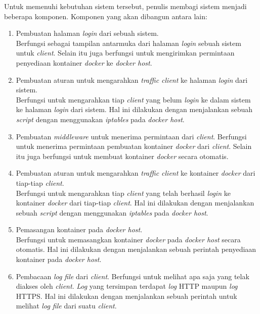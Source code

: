       \indent Untuk memenuhi kebutuhan sistem tersebut, penulis membagi sistem menjadi beberapa komponen. Komponen yang akan dibangun antara lain: 
      \begin{enumerate} 
      \item Pembuatan halaman \textit{login} dari sebuah sistem.\\
	      Berfungsi sebagai tampilan antarmuka dari halaman \textit{login} sebuah sistem untuk \textit{client}. Selain itu juga berfungsi untuk mengirimkan permintaan penyediaan kontainer \textit{docker} ke \textit{docker host}.
	  \item Pembuatan aturan untuk mengarahkan \textit{traffic client} ke halaman \textit{login} dari sistem.\\
		  Berfungsi untuk mengarahkan tiap \textit{client} yang belum \textit{login} ke dalam sistem ke halaman \textit{login} dari sistem. Hal ini dilakukan dengan menjalankan sebuah \textit{script} dengan menggunakan \textit{iptables} pada \textit{docker host}.
	  \item Pembuatan \textit{middleware} untuk menerima permintaan dari \textit{client}.
		  Berfungsi untuk menerima permintaan pembuatan kontainer \textit{docker} dari \textit{client}. Selain itu juga berfungsi untuk membuat kontainer \textit{docker} secara otomatis.
	  \item Pembuatan aturan untuk mengarahkan \textit{traffic client} ke kontainer \textit{docker} dari tiap-tiap \textit{client}.\\
		  Berfungsi untuk mengarahkan tiap \textit{client} yang telah berhasil \textit{login} ke kontainer \textit{docker} dari tiap-tiap \textit{client}. Hal ini dilakukan dengan menjalankan sebuah \textit{script} dengan menggunakan \textit{iptables} pada \textit{docker host}.
	  \item Pemasangan kontainer pada \textit{docker host}.\\
		  Berfungsi untuk memasangkan kontainer \textit{docker} pada \textit{docker host} secara otomatis. Hal ini dilakukan dengan menjalankan sebuah perintah penyediaan kontainer pada \textit{docker host}.
	  \item Pembacaan \textit{log file} dari \textit{client}.
		  Berfungsi untuk melihat apa saja yang telak diakses oleh \textit{client}. \textit{Log} yang tersimpan terdapat \textit{log} HTTP maupun \textit{log} HTTPS. Hal ini dilakukan dengan menjalankan sebuah perintah untuk melihat \textit{log file} dari suatu \textit{client}.
        
      \end{enumerate}
      
